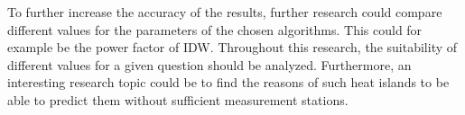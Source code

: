 To further increase the accuracy of the results, further research could compare different values for the parameters of the chosen algorithms. This could for example be the power factor of IDW. Throughout this research, the suitability of different values for a given question should be analyzed. Furthermore, an interesting research topic could be to find the reasons of such heat islands to be able to predict them without sufficient measurement stations.

